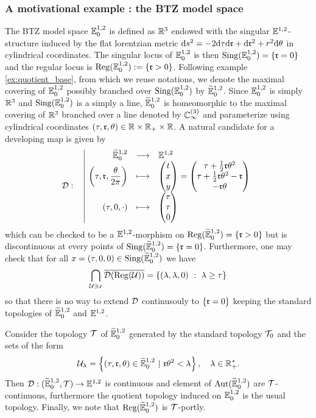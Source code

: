 \subsubsection{A motivational example : the BTZ model space}
\label{sec:mot_BTZ}
The BTZ model space $\mass{0}$ is defined as $\RR^3$ endowed with the singular $\mass{}$-structure induced by the flat lorentzian metric $\d s^2=-2\d\tau \d \r +\d \r^2+ r^2 \d \theta$ in cylindrical coordinates.
The singular locus of $\mass{0}$ is then $\sing(\mass{0})=\{\r=0\}$ and the regular locus 
is $\reg(\BTZ):= \{\r>0\}$. 
Following example \ref{ex:quotient_base}, from which we reuse notations, we denote  the maximal covering of $\BTZ$ possibly branched over $\sing(\BTZ)$  by $\BTZtilde$. Since $\BTZ$ is simply $\RR^3$ and $\sing(\BTZ)$ is a simply a line, $\BTZtilde$ is homeomorphic to the maximal covering of $\RR^3$ branched over a line denoted by  $\cyl{3}$ and parameterize using cylindrical coordinates $(\tau,\r,\theta)\in \RR\times\RR_+\times \RR$. A natural candidate for a developing map is given by 
$$\fonctiondeux{\D}{\BTZtilde}{\E^{1,2}}{\left(\tau,\r,\frac{\theta}{2\pi}\right)}{
\begin{pmatrix}t \\ x \\ y\end{pmatrix}=\begin{pmatrix} \tau + \frac{1}{2}\r\theta^2 \\ \tau + \frac{1}{2}\r\theta^2 -\r \\ -\r\theta  \end{pmatrix}
}{(\tau,0,\cdot)}{\begin{pmatrix}\tau \\ \tau \\ 0\end{pmatrix}}$$
which can be checked to be a $\E^{1,2}$-morphism on $\reg(\BTZtilde)=\{\r>0\}$ but is discontinuous at every points of $\sing(\BTZtilde)=\{\r=0\}$. Furthermore, one may check that for all  $x=(\tau,0,0)\in \sing(\BTZtilde)$ we have  $$\bigcap_{\U\ni x}\overline {\D(\reg(\U))}=\{(\lambda,\lambda,0)~:~\lambda \geq \tau\}$$ so that there is no way to extend $\D$ continusouly to $\{\r=0\}$ keeping the standard topologies of $\BTZtilde$ and $\mass{}$.

Consider the topology $\T$ of $\BTZtilde$ generated by the standard topology $\T_0$ and the sets of the form $$\U_\lambda = \left\{(\tau,\r,\theta)\in \BTZtilde ~|~ \r\theta^2< \lambda  \right\},\quad \lambda \in \RR_+^*.$$
Then $\D:(\BTZtilde,\T)\rightarrow \mass{}$ is continuous  and element of $\Aut(\BTZtilde)$ are $\T$-continuous, furthermore the quotient topology induced on $\BTZ$ is the usual topology.
 Finally, we note that $\reg(\BTZtilde)$ is $\T$-portly.



